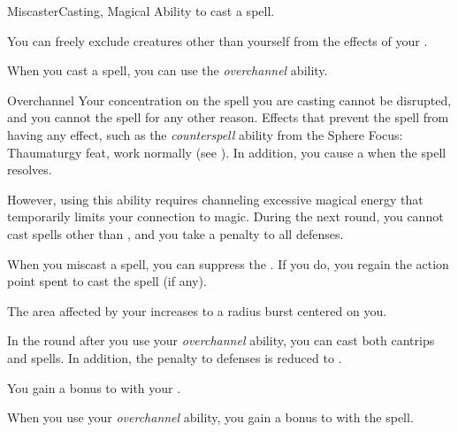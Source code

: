     \begin{feat}{Miscaster}{Casting, Magical}
        \featpre Ability to cast a spell.

         You can freely exclude creatures other than yourself from the effects of your .

         When you cast a spell, you can use the \textit{overchannel} ability.
        \begin{freeability}{Overchannel}
            Your concentration on the spell you are casting cannot be disrupted, and you cannot  the spell for any other reason.
            Effects that prevent the spell from having any effect, such as the \textit{counterspell} ability from the Sphere Focus: Thaumaturgy feat, work normally (see ).
            In addition, you cause a  when the spell resolves.

            However, using this ability requires channeling excessive magical energy that temporarily limits your connection to magic.
            During the next round, you cannot cast spells other than , and you take a  penalty to all defenses.
        \end{freeability}

         When you miscast a spell, you can suppress the .
        If you do, you regain the action point spent to cast the spell (if any).

         The area affected by your  increases to a \areamed radius burst centered on you.

         In the round after you use your \textit{overchannel} ability, you can cast both cantrips and spells.
        In addition, the penalty to defenses is reduced to .

         You gain a  bonus to  with your .

         When you use your \textit{overchannel} ability, you gain a  bonus to  with the spell.
    \end{feat}

